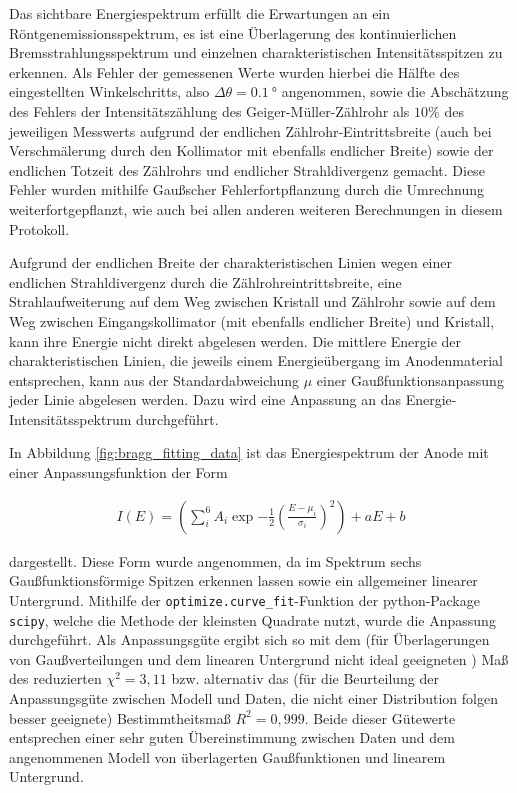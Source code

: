 Das sichtbare Energiespektrum erfüllt die Erwartungen an ein Röntgenemissionsspektrum, es ist eine Überlagerung des kontinuierlichen Bremsstrahlungsspektrum und einzelnen charakteristischen Intensitätsspitzen zu erkennen.
Als Fehler der gemessenen Werte wurden hierbei die Hälfte des eingestellten Winkelschritts, also $\Delta \theta = \SI{0.1}{\degree}$ angenommen, sowie die Abschätzung des Fehlers der Intensitätszählung des Geiger-Müller-Zählrohr als $10\%$ des jeweiligen Messwerts aufgrund der endlichen Zählrohr-Eintrittsbreite (auch bei Verschmälerung durch den Kollimator mit ebenfalls endlicher Breite) sowie der endlichen Totzeit des Zählrohrs und endlicher Strahldivergenz gemacht. Diese Fehler wurden mithilfe Gaußscher Fehlerfortpflanzung\cite[8-9]{gerthsen} durch die Umrechnung weiterfortgepflanzt, wie auch bei allen anderen weiteren Berechnungen in diesem Protokoll.

Aufgrund der endlichen Breite der charakteristischen Linien wegen einer endlichen Strahldivergenz durch die Zählrohreintrittsbreite, eine Strahlaufweiterung auf dem Weg zwischen Kristall und Zählrohr sowie auf dem Weg zwischen Eingangskollimator (mit ebenfalls endlicher Breite) und Kristall, kann ihre Energie nicht direkt abgelesen werden. Die mittlere Energie der charakteristischen Linien, die jeweils einem Energieübergang im Anodenmaterial entsprechen, kann aus der Standardabweichung $\mu$ einer Gaußfunktionsanpassung jeder Linie abgelesen werden. Dazu wird eine Anpassung an das Energie-Intensitätsspektrum durchgeführt.

In Abbildung \ref{fig:bragg_fitting_data} ist das Energiespektrum der Anode mit einer Anpassungsfunktion der Form

\begin{align} \label{eq:bragg_spectrum}
    I(E)=\left(\sum_i^6 A_i \exp{-\frac{1}{2}(\frac{E-\mu_i}{\sigma_i})^2}\right)+aE+b
\end{align}

dargestellt. Diese Form wurde angenommen, da im Spektrum sechs Gaußfunktionsförmige Spitzen erkennen lassen sowie ein allgemeiner linearer Untergrund. Mithilfe der \texttt{optimize.curve\_fit}-Funktion der python-Package \texttt{scipy}, welche die Methode der kleinsten Quadrate nutzt, wurde die Anpassung durchgeführt. Als Anpassungsgüte ergibt sich so mit dem (für Überlagerungen von Gaußverteilungen und dem linearen Untergrund nicht ideal geeigneten \cite{chisquare}) Maß des reduzierten $\chi^2=3,11$ bzw. alternativ das (für die Beurteilung der Anpassungsgüte zwischen Modell und Daten, die nicht einer Distribution folgen besser geeignete) Bestimmtheitsmaß $R^2=0,999$. Beide dieser Gütewerte entsprechen einer sehr guten Übereinstimmung zwischen Daten und dem angenommenen Modell von überlagerten Gaußfunktionen und linearem Untergrund.

